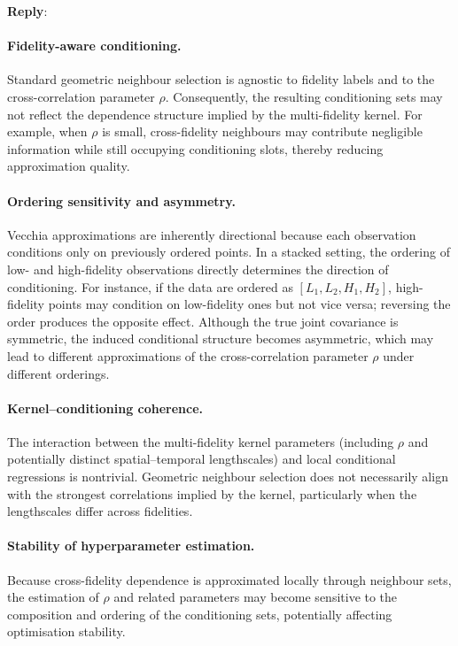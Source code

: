 \documentclass[12pt]{article}
\newcommand{\0}{\mathbf{0}}
\newcounter{reviewer}
\newcounter{point}[reviewer]
\newenvironment{reply}
   {\medskip \noindent \begin{sf}\color{Blue}\textbf{Reply}:\  }
   {\medskip \end{sf}}
\begin{document}
\begin{reply}
\paragraph{Fidelity-aware conditioning.}
Standard geometric neighbour selection is agnostic to fidelity labels and to the cross-correlation parameter $\rho$. Consequently, the resulting conditioning sets may not reflect the dependence structure implied by the multi-fidelity kernel. For example, when $\rho$ is small, cross-fidelity neighbours may contribute negligible information while still occupying conditioning slots, thereby reducing approximation quality.

\paragraph{Ordering sensitivity and asymmetry.}
Vecchia approximations are inherently directional because each observation conditions only on previously ordered points. In a stacked setting, the ordering of low- and high-fidelity observations directly determines the direction of conditioning. For instance, if the data are ordered as $[L_1, L_2, H_1, H_2]$, high-fidelity points may condition on low-fidelity ones but not vice versa; reversing the order produces the opposite effect. Although the true joint covariance is symmetric, the induced conditional structure becomes asymmetric, which may lead to different approximations of the cross-correlation parameter $\rho$ under different orderings.

\paragraph{Kernel–conditioning coherence.}
The interaction between the multi-fidelity kernel parameters (including $\rho$ and potentially distinct spatial–temporal lengthscales) and local conditional regressions is nontrivial. Geometric neighbour selection does not necessarily align with the strongest correlations implied by the kernel, particularly when the lengthscales differ across fidelities.

\paragraph{Stability of hyperparameter estimation.}
Because cross-fidelity dependence is approximated locally through neighbour sets, the estimation of $\rho$ and related parameters may become sensitive to the composition and ordering of the conditioning sets, potentially affecting optimisation stability.


\end{reply}
\end{document}
